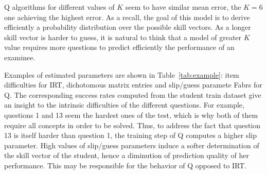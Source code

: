 \documentclass{edm_template}
\begin{document}
Q algorithms for different values of $K$ seem to have similar mean error, the $K = 6$ one achieving the highest error. As a recall, the goal of this model is to derive efficiently a probability distribution over the possible skill vectors. As a longer skill vector is harder to guess, it is natural to think that a model of greater $K$ value requires more questions to predict efficiently the performance of an examinee.

Examples of estimated parameters are shown in Table~\ref{tab:example}: item difficulties for IRT, dichotomous matrix entries and slip/guess paramete	Fabrs for Q. The corresponding success rates computed from the student train dataset give an insight to the intrinsic difficulties of the different questions. For example, questions 1 and 13 seem the hardest ones of the test, which is why both of them require all concepts in order to be solved. Thus, to address the fact that question 13 is itself harder than question 1, the training step of Q computes a higher slip parameter. High values of slip/guess parameters induce a softer determination of the skill vector of the student, hence a diminution of prediction quality of her performance. This may be responsible for the behavior of Q opposed to IRT.

\end{document}
